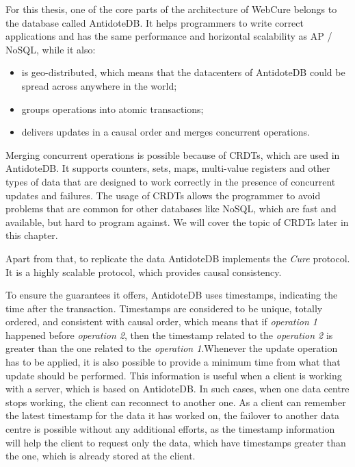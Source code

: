 For this thesis, one of the core parts of the architecture of WebCure belongs to the database called AntidoteDB\cite{4}. It helps programmers to write correct applications and has the same performance and horizontal scalability as AP / NoSQL\cite{14}, while it also:

\begin{itemize}
\item {is geo-distributed, which means that the datacenters of AntidoteDB could be spread across anywhere in the world;}
\item {groups operations into atomic transactions\cite{9, 15};}
\item {delivers updates in a causal order and merges concurrent operations.}
\end{itemize} 

Merging concurrent operations is possible because of CRDTs\cite{2}, which are used in AntidoteDB. It supports counters, sets, maps, multi-value registers and other types of data that are designed to work correctly in the presence of concurrent updates and failures. The usage of CRDTs allows the programmer to avoid problems that are common for other databases like NoSQL, which are fast and available, but hard to program against\cite{15}. We will cover the topic of CRDTs later in this chapter.

Apart from that, to replicate the data AntidoteDB implements the \textit{Cure}\cite{15} protocol. It is a highly scalable protocol, which provides causal consistency. 

To ensure the guarantees it offers, AntidoteDB uses timestamps, indicating the time after the transaction. Timestamps are considered to be unique, totally ordered, and consistent with causal order, which means that if \textit{operation 1} happened before \textit{operation 2}, then the timestamp related to the \textit{operation 2} is greater than the one related to the \textit{operation 1}\cite{2}.Whenever the update operation has to be applied, it is also possible to provide a minimum time from what that update should be performed. This information is useful when a client is working with a server, which is based on AntidoteDB. In such cases, when one data centre stops working, the client can reconnect to another one. As a client can remember the latest timestamp for the data it has worked on, the failover to another data centre is possible without any additional efforts, as the timestamp information will help the client to request only the data, which have timestamps greater than the one, which is already stored at the client.

